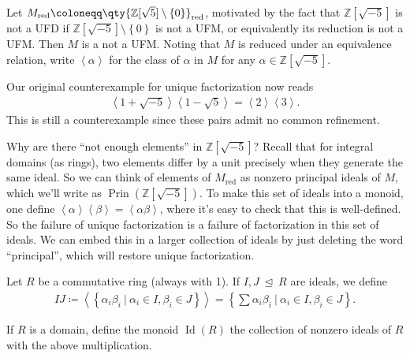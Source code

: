 \begin{remark}

Let
\(M_{{ \text{red} }} \coloneqq\qty{{\mathbb{Z}}[ \sqrt{5} ] \setminus\left\{{0}\right\}}_{{ \text{red} }}\),
motivated by the fact that \({\mathbb{Z}}[ \sqrt{-5} ]\) is not a UFD if
\({\mathbb{Z}}[ \sqrt{-5} ] \setminus\left\{{0}\right\}\) is not a UFM,
or equivalently its reduction is not a UFM. Then \(M\) is a not a UFM.
Noting that \(M\) is reduced under an equivalence relation, write
\(\left\langle{ \alpha}\right\rangle\) for the class of \(\alpha\) in
\(M\) for any \(\alpha\in {\mathbb{Z}}[ \sqrt{-5} ]\).

Our original counterexample for unique factorization now reads
\begin{align*}
\left\langle{ 1 + \sqrt{-5} }\right\rangle \left\langle{ 1 - \sqrt{5} }\right\rangle = \left\langle{2}\right\rangle \left\langle{3}\right\rangle
.\end{align*}
This is still a counterexample since these pairs admit no common
refinement.

Why are there ``not enough elements'' in \({\mathbb{Z}}[ \sqrt{-5} ]\)?
Recall that for integral domains (as rings), two elements differ by a
unit precisely when they generate the same ideal. So we can think of
elements of \(M_{{ \text{red} }}\) as nonzero principal ideals of \(M\),
which we'll write as
\(\mathop{\mathrm{Prin}}( {\mathbb{Z}}[ \sqrt{-5} ])\). To make this set
of ideals into a monoid, one define
\(\left\langle{ \alpha }\right\rangle \left\langle{ \beta }\right\rangle= \left\langle{ \alpha \beta }\right\rangle\),
where it's easy to check that this is well-defined. So the failure of
unique factorization is a failure of factorization in this set of
ideals. We can embed this in a larger collection of ideals by just
deleting the word ``principal'', which will restore unique
factorization.

\end{remark}

\begin{definition}

Let \(R\) be a commutative ring (always with 1). If
\(I, J {~\trianglelefteq~}R\) are ideals, we define
\begin{align*}
IJ \coloneqq\left\langle{ \left\{{ \alpha_i \beta_i {~\mathrel{\Big|}~}\alpha_i \in I, \beta_i \in J }\right\}}\right\rangle = \left\{{ \sum \alpha_i \beta_i {~\mathrel{\Big|}~}\alpha_i \in I, \beta_i \in J}\right\}
.\end{align*}

If \(R\) is a domain, define the monoid \(\operatorname{Id}(R)\) the
collection of nonzero ideals of \(R\) with the above multiplication.

\end{definition}

